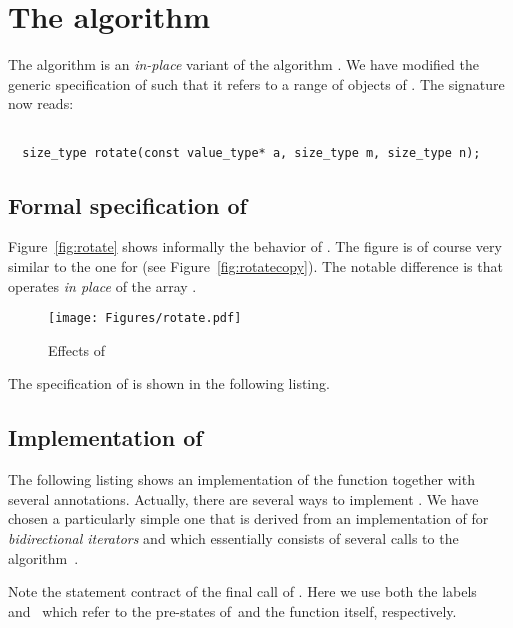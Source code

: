 
\section{The \rotatei algorithm}

The algorithm \rotatei is an \emph{in-place} variant of the algorithm .
We have modified the generic specification of \rotatei \cite[\S 28.6.11]{cxx-17-draft}
such that it refers to a range of objects of .
%
The signature now reads:

\begin{lstlisting}[style=acsl-block]

  size_type rotate(const value_type* a, size_type m, size_type n);
\end{lstlisting}


\subsection{Formal specification of \rotatei}

Figure~\ref{fig:rotate} shows informally the behavior of \rotatei.
The figure is of course very similar to the one for
\rotatecopy (see Figure~\ref{fig:rotatecopy}).
The notable difference is that \rotatei operates \emph{in place} of the array
.

\begin{figure}[hbt]
\centering
\texttt{[image: Figures/rotate.pdf]}
\caption{ Effects of \rotatei}
\end{figure}

The specification of \rotatei is shown in the following listing.



\subsection{Implementation of \rotatei}

The following listing shows an implementation of the \rotatei function
together with several \acsl annotations.
Actually, there are several ways to implement \rotatei.
We have chosen a particularly simple one that is derived from an implementation of
 for \emph{bidirectional iterators} \cite[\S 27.2.6]{cxx-17-draft}
and which essentially consists of several calls to the algorithm~.

Note the statement contract of the final call of .
Here we use both the labels~ and~ which refer
to the pre-states of~\reverse and the function \rotatei itself, respectively.



\clearpage

